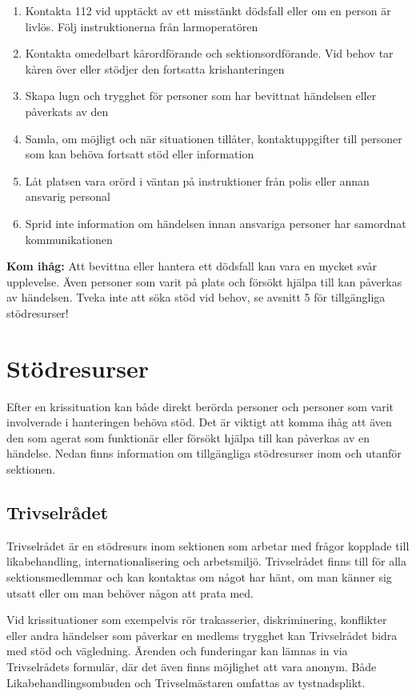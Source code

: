\documentclass[pdfbookmarks,a4paper,11pt]{article}
\begin{document}
\begin{enumerate}
    \item Kontakta 112 vid upptäckt av ett misstänkt dödsfall eller om en person är livlös. Följ instruktionerna från larmoperatören
    \item Kontakta omedelbart kårordförande och sektionsordförande. Vid behov tar kåren över eller stödjer den fortsatta krishanteringen
    \item Skapa lugn och trygghet för personer som har bevittnat händelsen eller påverkats av den
    \item Samla, om möjligt och när situationen tillåter, kontaktuppgifter till personer som kan behöva fortsatt stöd eller information
    \item Låt platsen vara orörd i väntan på instruktioner från polis eller annan ansvarig personal
    \item Sprid inte information om händelsen innan ansvariga personer har samordnat kommunikationen
\end{enumerate}

\textbf{Kom ihåg:} Att bevittna eller hantera ett dödsfall kan vara en mycket svår upplevelse. Även personer som varit på plats och försökt hjälpa till kan påverkas av händelsen. Tveka inte att söka stöd vid behov, se avsnitt 5 för tillgängliga stödresurser!

\section{Stödresurser}

Efter en krissituation kan både direkt berörda personer och personer som varit involverade i hanteringen behöva stöd. Det är viktigt att komma ihåg att även den som agerat som funktionär eller försökt hjälpa till kan påverkas av en händelse. Nedan finns information om tillgängliga stödresurser inom och utanför sektionen.

\subsection{Trivselrådet}

Trivselrådet är en stödresurs inom sektionen som arbetar med frågor kopplade till likabehandling, internationalisering och arbetsmiljö. Trivselrådet finns till för alla sektionsmedlemmar och kan kontaktas om något har hänt, om man känner sig utsatt eller om man behöver någon att prata med. 

Vid krissituationer som exempelvis rör trakasserier, diskriminering, konflikter eller andra händelser som påverkar en medlems trygghet kan Trivselrådet bidra med stöd och vägledning. Ärenden och funderingar kan lämnas in via Trivselrådets formulär, där det även finns möjlighet att vara anonym. Både Likabehandlingsombuden och Trivselmästaren omfattas av tystnadsplikt.
\end{document}
